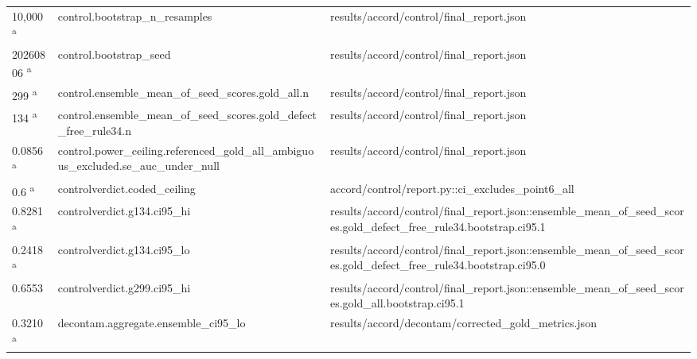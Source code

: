 \begin{longtable}{@{}p{0.7in}p{1.9in}p{2.6in}@{}}
10,000 \textsuperscript{a} & control.\allowbreak{}bootstrap\_n\_resamples & results/\allowbreak{}accord/\allowbreak{}control/\allowbreak{}final\_report.\allowbreak{}json\\
20260806 \textsuperscript{a} & control.\allowbreak{}bootstrap\_seed & results/\allowbreak{}accord/\allowbreak{}control/\allowbreak{}final\_report.\allowbreak{}json\\
299 \textsuperscript{a} & control.\allowbreak{}ensemble\_mean\_of\_seed\_scores.\allowbreak{}gold\_all.\allowbreak{}n & results/\allowbreak{}accord/\allowbreak{}control/\allowbreak{}final\_report.\allowbreak{}json\\
134 \textsuperscript{a} & control.\allowbreak{}ensemble\_mean\_of\_seed\_scores.\allowbreak{}gold\_defect\_free\_rule34.\allowbreak{}n & results/\allowbreak{}accord/\allowbreak{}control/\allowbreak{}final\_report.\allowbreak{}json\\
0.0856 \textsuperscript{a} & control.\allowbreak{}power\_ceiling.\allowbreak{}referenced\_gold\_all\_ambiguous\_excluded.\allowbreak{}se\_auc\_under\_null & results/\allowbreak{}accord/\allowbreak{}control/\allowbreak{}final\_report.\allowbreak{}json\\
0.6 \textsuperscript{a} & controlverdict.\allowbreak{}coded\_ceiling & accord/\allowbreak{}control/\allowbreak{}report.\allowbreak{}py::ci\_excludes\_point6\_all\\
0.8281 \textsuperscript{a} & controlverdict.\allowbreak{}g134.\allowbreak{}ci95\_hi & results/\allowbreak{}accord/\allowbreak{}control/\allowbreak{}final\_report.\allowbreak{}json::ensemble\_mean\_of\_seed\_scores.\allowbreak{}gold\_defect\_free\_rule34.\allowbreak{}bootstrap.\allowbreak{}ci95.\allowbreak{}1\\
0.2418 \textsuperscript{a} & controlverdict.\allowbreak{}g134.\allowbreak{}ci95\_lo & results/\allowbreak{}accord/\allowbreak{}control/\allowbreak{}final\_report.\allowbreak{}json::ensemble\_mean\_of\_seed\_scores.\allowbreak{}gold\_defect\_free\_rule34.\allowbreak{}bootstrap.\allowbreak{}ci95.\allowbreak{}0\\
0.6553 & controlverdict.\allowbreak{}g299.\allowbreak{}ci95\_hi & results/\allowbreak{}accord/\allowbreak{}control/\allowbreak{}final\_report.\allowbreak{}json::ensemble\_mean\_of\_seed\_scores.\allowbreak{}gold\_all.\allowbreak{}bootstrap.\allowbreak{}ci95.\allowbreak{}1\\
0.3210 \textsuperscript{a} & decontam.\allowbreak{}aggregate.\allowbreak{}ensemble\_ci95\_lo & results/\allowbreak{}accord/\allowbreak{}decontam/\allowbreak{}corrected\_gold\_metrics.\allowbreak{}json\\

\end{longtable}

